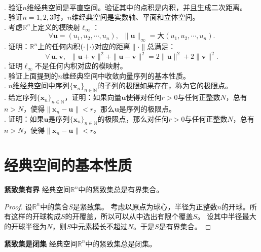 \documentclass[12pt,UTF8]{ctexbook}
\begin{document}
\begin{appendix}
\begin{xt}
    \mbox{}\\
    . 验证$n$维经典空间是平直空间。验证其中的点积是内积，并且生成二次距离。\\
    . 验证$n=1,2,3$时，$n$维经典空间是实数轴、平面和立体空间。\\
    . 考虑$\mathbb{R}^n$上定义的模映射$\ell_{\infty}$：
    $$ \forall \mathbf{u} = (u_1, u_2, \cdots, u_n), \;\; \| \mathbf{u} \|_{\infty} = \text{大}(u_1, u_2, \cdots, u_n).$$
    . 证明：$\mathbb{R}^n$上的任何内积$\displaystyle\left( \cdot \,|\, \cdot \right)$对应的距离$\|\cdot \|$总满足：
    $$\forall \, \mathbf{u}, \mathbf{v},\;\; \|\mathbf{u} + \mathbf{v}\|^2 + \|\mathbf{u} - \mathbf{v}\|^2 = 2\|\mathbf{u}\|^2 + 2\|\mathbf{v}\|^2. $$
    . 证明$\ell_{\infty}$不是任何内积对应的模映射。\\
    . 验证上面提到的$n$维经典空间中收敛向量序列的基本性质。\\
    . $n$维经典空间中序列$\{\mathbf{x}_n\}_{n\in\mathbb{N}}$的子列的极限如果存在，称为它的极限点。\\
    . 给定序列$\{\mathbf{x}_n\}_{n\in\mathbb{N}}$，证明：如果向量$\mathbf{u}$使得对任何$r>0$与任何正整数$N$，总有$n>N$，使得$\|\mathbf{x}_n - \mathbf{u}\| < r$，那么$\mathbf{u}$是序列的极限点。\\
    . 证明：如果$\mathbf{u}$是序列$\{\mathbf{x}_n\}_{n\in\mathbb{N}}$的极限点，那么对任何$r>0$与任何正整数$N$，总有$n>N$，使得$\|\mathbf{x}_n - \mathbf{u}\| < r$。\\

\end{xt}

\section{经典空间的基本性质}

\begin{tm}{\textbf{紧致集有界}}\label{tm:b-2-0}
    经典空间$\mathbb{R}^n$中的紧致集总是有界集合。
\end{tm}

\begin{proof}
    设$\mathbb{R}^n$中的集合$S$是紧致集。
    考虑以原点为球心，半径为正整数$n$的开球。所有这样的开球构成$S$的开覆盖，所以可以从中选出有限个覆盖$S$。
    设其中半径最大的开球半径为$N$，则$S$中元素模长不超过$N$。于是$S$是有界集合。
\end{proof}

\begin{tm}{\textbf{紧致集是闭集}}\label{tm:b-2-10}
    经典空间$\mathbb{R}^n$中的紧致集总是闭集。
\end{tm}


\end{appendix}
\end{document}
